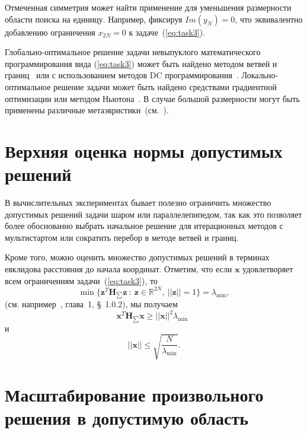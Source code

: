 Отмеченная симметрия может найти применение для уменьшения размерности области поиска на единицу. Например, фиксируя $Im(y_{N})=0$, что эквивалентно добавлению ограничения $x_{2N}=0$ к задаче~(\ref{eq:task3}).

Глобально-оптимальное решение задачи невыпуклого математического программирования вида (\ref{eq:task3}) может быть найдено методом
ветвей и границ~\cite{horst:global,tawarmalani:global} или с использованием методов DC программирования~\cite{horst:handbook,strekalovsky:global}. Локально-оптимальное решение задачи может быть найдено средствами градиентной оптимизации или методом Ньютона~\cite{himmelblau:nlp}. В случае большой размерности могут быть применены различные метаэвристики~(см.~\cite{eberhart:swarm,storn:de}).


\section{Верхняя оценка нормы допустимых решений} \label{subsec:top}

В вычислительных экспериментах бывает полезно ограничить множество допустимых решений задачи шаром или параллелепипедом, так как это позволяет более обоснованно выбрать начальное решение для итерационных методов с мультистартом или сократить перебор в методе ветвей и границ.

Кроме того, можно оценить множество допустимых решений в терминах евклидова расстояния до начала координат. Отметим, что если $\textbf{x}$ удовлетворяет всем ограничениям задачи~(\ref{eq:task3}), то
$$
\min\{\textbf{z}^T \textbf{H}_{\sum} \textbf{z} \ : \ \textbf{z}\in
\mathbb{R}^{2N}, \ ||\textbf{z}|| =1\} = \lambda_{\min},
$$
(см. например~\cite{horn:matrix}, глава~1, \S~1.0.2), мы получаем
$$
\textbf{x}^T \textbf{H}_{\sum} \textbf{x} \ge ||\textbf{x}||^2
\lambda_{\min}\ \
$$
и
\begin{equation} \label{eqn:bound}
||\textbf{x}||\le \sqrt{\frac{N}{\lambda_{\min}}}.
\end{equation}

\section{Масштабирование произвольного решения в допустимую область} \label{sec:scaling}

